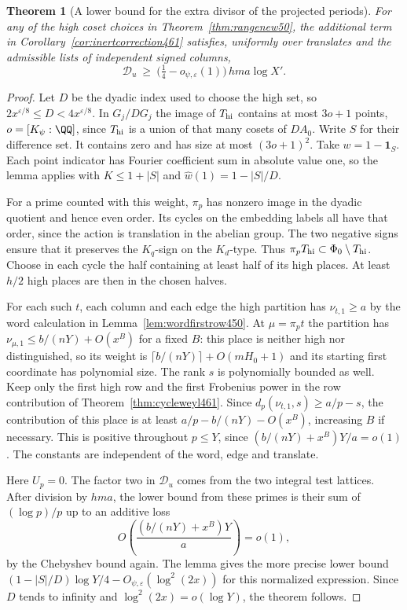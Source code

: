 \documentclass[a4paper,11pt]{article}
\newtheorem{theorem}[proposition]{Theorem}
\theoremstyle{definition}
\theoremstyle{remark}
\numberwithin{equation}{section}
\begin{document}
\begin{theorem}[A lower bound for the extra divisor of the projected periods]\leavevmode
\label{thm:inertmass462}
For any of the high coset choices in Theorem~\ref{thm:rangenew50},
the additional term in Corollary~\ref{cor:inertcorrection461}
satisfies, uniformly over translates and the admissible lists
of independent signed columns,
\[
          \mathcal D_u\ \ge\
          \bigl(\tfrac14-o_{\psi,\varepsilon}(1)\bigr)\,
                              hma\log X'.
\]
\end{theorem}
\begin{proof}
Let \(D\) be the dyadic index used to choose the high set,
so \(2x^{\varepsilon/8}\le D<4x^{\varepsilon/8}\).
In \(G_j/DG_j\) the image of \(T_{\rm hi}\) contains at most
\(3o+1\) points, \(o=[K_\psi:\QQ]\), since \(T_{\rm hi}\)
is a union of that many cosets of \(DA_0\). Write \(S\)
for their difference set. It contains zero and has size at
most \((3o+1)^2\). Take \(w=1-\mathbf1_S\). Each point
indicator has Fourier coefficient sum in absolute value one,
so the lemma applies with \(K\le1+|S|\) and
\(\widehat w(1)=1-|S|/D\).

For a prime counted with this weight, \(\pi_p\) has nonzero
image in the dyadic quotient and hence even order. Its cycles
on the embedding labels all have that order, since the action
is translation in the abelian group. The two negative signs
ensure that it preserves the \(K_q\)-sign on the \(K_d\)-type.
Thus \(\pi_p T_{\rm hi}\subset \Phi_0\setminus T_{\rm hi}\).
Choose in each cycle the half containing at least half of its
high places. At least \(h/2\) high places are then in the
chosen halves.

For each such \(t\), each column and each edge the high
partition has \(\nu_{t,1}\ge a\) by the word calculation in
Lemma~\ref{lem:wordfirstrow450}. At \(\mu=\pi_p t\) the
partition has \(\nu_{\mu,1}\le b/(nY)+O(x^B)\) for a fixed
\(B\): this place is neither high nor distinguished, so its
weight is \(\lceil b/(nY)\rceil+O(mH_0+1)\) and its starting
first coordinate has polynomial size. The rank \(s\) is
polynomially bounded as well. Keep only the first high row
and the first Frobenius power in the row contribution of
Theorem~\ref{thm:cycleweyl461}. Since
\(d_p(\nu_{t,1},s)\ge a/p-s\), the contribution of this place
is at least \(a/p-b/(nY)-O(x^B)\), increasing \(B\) if
necessary. This is positive throughout \(p\le Y\), since
\((b/(nY)+x^B)Y/a=o(1)\). The constants are independent
of the word, edge and translate.

Here \(U_p=0\). The factor two in \(\mathcal D_u\) comes from
the two integral test lattices. After division by \(hma\), the
lower bound from these primes is their sum of \((\log p)/p\)
up to an additive loss
\[
  O\!\left(\frac{(b/(nY)+x^B)Y}{a}\right)=o(1),
\]
by the Chebyshev bound again. The lemma gives the more precise
lower bound \((1-|S|/D)\log Y/4-O_{\psi,\varepsilon}(\log^2(2x))\)
for this normalized expression. Since \(D\) tends to infinity
and \(\log^2(2x)=o(\log Y)\), the theorem follows.
\end{proof}
\end{document}

